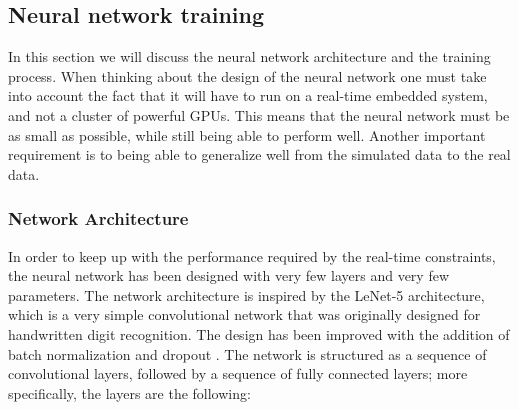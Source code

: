 \documentclass[a4paper,12pt,sort&compress]{article}
\begin{document}
\clearpage

        
\subsection{Neural network training}
    In this section we will discuss the neural network architecture and the training process. When
    thinking about the design of the neural network one must take into account the fact that it will
    have to run on a real-time embedded system, and not a cluster of powerful GPUs. This means that 
    the neural network must be as small as possible, while still being able to perform well. Another
    important requirement is to being able to generalize well from the simulated data to the real data.

\subsubsection*{Network Architecture}
    In order to keep up with the performance required by the real-time constraints, the neural
    network has been designed with very few layers and very few parameters. The network architecture
    is inspired by the LeNet-5 \citep*{lecun} architecture, which is a very simple convolutional
    network that was originally designed for handwritten digit recognition. The design has been
    improved with the addition of batch normalization \citep*{batch_norm} and dropout
    \citep*{dropout}.
    The network is structured as a sequence of convolutional layers, followed by a sequence of fully
    connected layers; more specifically, the layers are the following:
\end{document}
